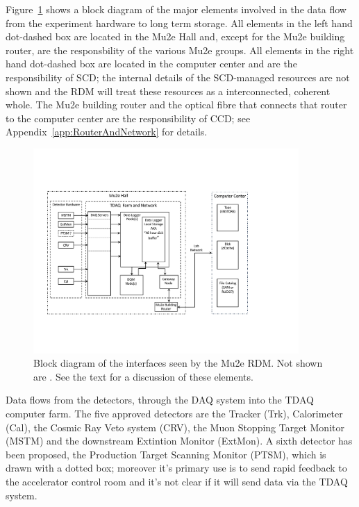 Figure~\ref{fig:blockdiagram} shows a block diagram of the major elements involved
in the data flow from the experiment hardware to long term storage.
All elements in the left hand dot-dashed box are located in the Mu2e Hall
and, except for the Mu2e building router, are the responsbility of the various Mu2e groups.
All elements in the right hand dot-dashed box are located in the computer center
and are the responsibility of SCD; the internal details of the SCD-managed resources
are not shown and the RDM will treat these resources as a interconnected, coherent whole.
The Mu2e building router and the optical fibre that connects that router
to the computer center are the responsibility of CCD;
see Appendix~\ref{app:RouterAndNetwork} for details.

\begin{figure}[tbp]
\centering
\includegraphics[width=0.9\textwidth]{figures/interface_with_TDAQ.pdf}
\caption[Block diagram of interfaces seen by the Mu2e RDM]{
  Block diagram of the interfaces seen by the Mu2e RDM.
  Not shown are .  See the text for a discussion of these elements.}
\label{fig:blockdiagram}
\end{figure}

Data flows from the detectors, through the DAQ system into the TDAQ computer farm.
The five approved detectors are the Tracker (Trk), Calorimeter (Cal), the Cosmic Ray Veto system (CRV),
the Muon Stopping Target Monitor (MSTM) and the downstream Extintion Monitor (ExtMon).
A sixth detector has been proposed, the Production Target Scanning Monitor (PTSM),
which is drawn with a dotted box;
moreover it's primary use is to send rapid feedback to the accelerator control room
and it's not clear if it will send data via the TDAQ system.

